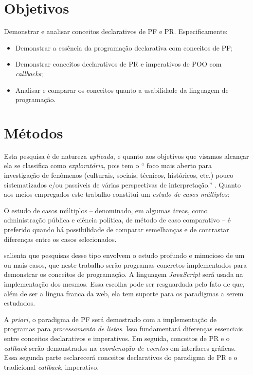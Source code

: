 \section{Objetivos}
\label{sec:org6c60906}
Demonstrar e analisar conceitos declarativos de PF e PR. Especificamente:

\begin{itemize}
\item Demonstrar a essência da programação declarativa com conceitos de PF;
\item Demonstrar conceitos declarativos de PR e imperativos de POO com
\emph{callbacks};
\item Analisar e comparar os conceitos quanto a usabilidade da linguagem de
programação.
\end{itemize}

\section{Métodos}
\label{sec:orgde8ab3f}
Esta pesquisa é de natureza \emph{aplicada}, e quanto aos objetivos que visamos
alcançar ela se classifica como \emph{exploratória}, pois tem o “\textelp{} foco
mais aberto para investigação de fenômenos (culturais, sociais, técnicos,
históricos, etc.) pouco sistematizados e/ou passíveis de várias perspectivas
de interpretação.” \cite[p. 32]{leal2011}.
Quanto aos meios empregados este trabalho constitui um \emph{estudo de casos
múltiplos}:

\begin{citacao}
  O estudo de casos múltiplos – denominado, em algumas áreas, como
  administração pública e ciência política, de método de caso comparativo – é
  preferido quando há possibilidade de comparar semelhanças e de contrastar
  diferenças entre os casos selecionados. \cite[p. 43]{leal2011}
\end{citacao}

\textcite{yin2001} salienta que pesquisas desse tipo envolvem o estudo profundo
e minucioso de um ou mais casos, que neste trabalho serão programas concretos
implementados para demonstrar os conceitos de programação.
A linguagem \emph{JavaScript} será usada na implementação dos mesmos.
Essa escolha pode ser resguardada pelo fato de que, além de ser a língua
franca da web, ela tem suporte para os paradigmas a serem estudados.

A \emph{priori}, o paradigma de PF será demostrado com a implementação de programas
para \emph{processamento de listas}.
Isso fundamentará diferenças essenciais entre conceitos declarativos e
imperativos.
Em seguida, conceitos de PR e o \emph{callback} serão demonstrados na \emph{coordenação
de eventos} em interfaces gráficas.
Essa segunda parte esclarecerá conceitos declarativos do paradigma de PR e o
tradicional \emph{callback}, imperativo.

